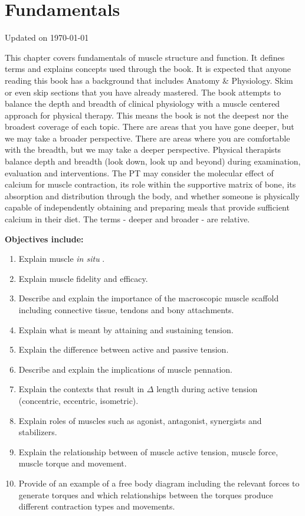\chapter{Fundamentals}\label{chp:fundamentals}
Updated on \today
\minitoc

This chapter covers fundamentals of muscle structure and function. It defines terms and explains concepts used through the book. It is expected that anyone reading this book has a background that includes Anatomy \& Physiology. Skim or even skip sections that you have already mastered. The book attempts to balance the depth and breadth of clinical physiology with a muscle centered approach for physical therapy. This means the book is not the deepest nor the broadest coverage of each topic. There are areas that you have gone deeper, but we may take a broader perspective. There are areas where you are comfortable with the breadth, but we may take a deeper perspective. Physical therapists balance depth and breadth (look down, look up and beyond) during examination, evaluation and interventions. The PT may consider the molecular effect of calcium for muscle contraction, its role within the supportive matrix of bone, its absorption and distribution through the body, and whether someone is physically capable of independently obtaining and preparing meals that provide sufficient calcium in their diet. The terms - deeper and broader - are relative.

\vspace{5mm}

\textbf{Objectives include:}
\begin{enumerate}
   \item Explain muscle \textit{in situ} .
   \item Explain muscle fidelity and efficacy. 
    \item Describe and explain the importance of the macroscopic muscle scaffold including connective tissue, tendons and bony attachments.
    \item Explain what is meant by attaining and sustaining tension.
    \item Explain the difference between active and passive tension.
    \item Describe and explain the implications of muscle pennation.
    \item Explain the contexts that result in $\Delta$ length during active tension (concentric, eccentric, isometric).
    \item Explain roles of muscles such as agonist, antagonist, synergists and stabilizers.
    \item Explain the relationship between of muscle active tension, muscle force, muscle torque and movement.
    \item Provide of an example of a free body diagram including the relevant forces to generate torques and which relationships between the torques produce different contraction types and movements.
\end{enumerate}

